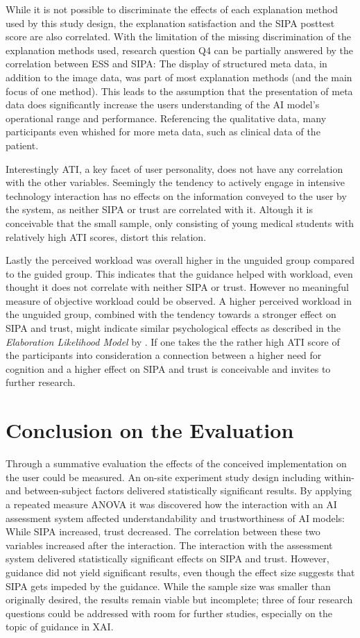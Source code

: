 \documentclass[11pt,a4paper,english]{scrreprt}
\begin{document}
While it is not possible to discriminate the effects of each explanation method used by this study design, the explanation satisfaction and the SIPA posttest score are also correlated. With the limitation of the missing discrimination of the explanation methods used, research question Q4 can be partially answered by the correlation between ESS and SIPA: The display of structured meta data, in addition to the image data, was part of most explanation methods (and the main focus of one method). This leads to the assumption that the presentation of meta data does significantly increase the users understanding of the AI model's operational range and performance. Referencing the qualitative data, many participants even whished for more meta data, such as clinical data of the patient.

Interestingly ATI, a key facet of user personality, does not have any correlation with the other variables. Seemingly the tendency to actively engage in intensive technology interaction has no effects on the information conveyed to the user by the system, as neither SIPA or trust are correlated with it. Altough it is conceivable that the small sample, only consisting of young medical students with relatively high ATI scores, distort this relation.

Lastly the perceived workload was overall higher in the unguided group compared to the guided group. This indicates that the guidance helped with workload, even thought it does not correlate with neither SIPA or trust. However no meaningful measure of objective workload could be observed. A higher perceived workload in the unguided group, combined with the tendency towards a stronger effect on SIPA and trust, might indicate similar psychological effects as described in the \textit{Elaboration Likelihood Model} by \textcite{petty_elaboration_1986}. If one takes the the rather high ATI score of the participants into consideration a connection between a higher need for cognition and a higher effect on SIPA and trust is conceivable and invites to further research.

\section{Conclusion on the Evaluation}
Through a summative evaluation the effects of the conceived implementation on the user could be measured. An on-site experiment study design including within- and between-subject factors delivered statistically significant results. By applying a repeated measure ANOVA it was discovered how the interaction with an AI assessment system affected understandability and trustworthiness of AI models: While SIPA increased, trust decreased. The correlation between these two variables increased after the interaction. The interaction with the assessment system delivered statistically significant effects on SIPA and trust. However, guidance did not yield significant results, even though the effect size suggests that SIPA gets impeded by the guidance. While the sample size was smaller than originally desired, the results remain viable but incomplete; three of four research questions could be addressed with room for further studies, especially on the topic of guidance in XAI.
\end{document}
